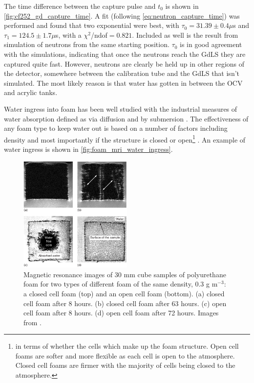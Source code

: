 



\par
The time difference between the capture pulse and $t_0$ is shown in \autoref{fig:cf252_gd_capture_time}.
A fit (following \autoref{eq:neutron_capture_time}) was performed and found that two exponential were best, with $\tau_0 = 31.39 \pm 0.4\mu$s and $\tau_1 = 124.5 \pm 1.7\mu$s, with a $\chi^2$/ndof$=0.821$.
Included as well is the result from simulation of neutrons from the same starting position.
$\tau_0$ is in good agreement with the simulations, indicating that once the neutrons reach the GdLS they are captured quite fast.
However, neutrons are clearly be held up in other regions of the detector, somewhere between the calibration tube and the GdLS that isn't simulated.
The most likely reason is that water has gotten in between the OCV and acrylic tanks.



\par
Water ingress into foam has been well studied  with the industrial measures of water absorption defined as via diffusion and by submersion \cite{foam_with_water_ref}.
The effectiveness of any foam type to keep water out is based on a number of factors including density and most importantly if the structure is closed or open\footnote{in terms of whether the cells which make up the foam structure. Open cell foams are softer and more flexible as each cell is open to the atmosphere. Closed cell foams are firmer with the majority of cells being closed to the atmosphere.} \cite{mechanical_properties_of_foam_ref}.
An example of water ingress is shown in \autoref{fig:foam_mri_water_ingress}.


\begin{figure}[]
\includegraphics[width=0.5\textwidth]{Figures/NeutronCaptureTime/foam_water_absorption.png}
\centering
\caption{Magnetic resonance images of 30 mm cube samples of polyurethane foam for two types of different foam of the same density, 0.3 g m${}^{-3}$: a closed cell foam (top) and an open cell foam (bottom).
(a) closed cell foam after 8 hours. (b) closed cell foam after 63 hours.
(c) open cell foam after 8 hours. (d) open cell foam after 72 hours.
Images from \cite{foam_mri_data_ref}.
}
\label{fig:foam_mri_water_ingress}
\end{figure}


